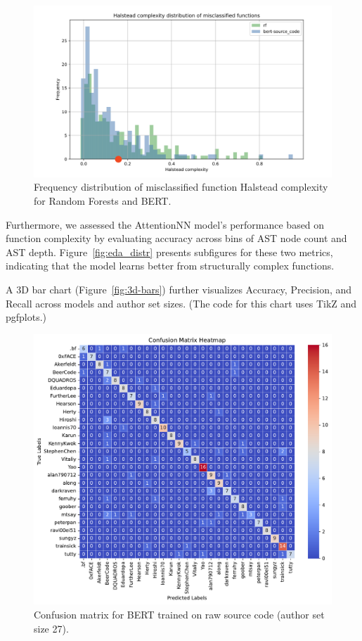 \documentclass[conference]{IEEEtran}
\begin{document}
\begin{figure}[!b]
    \centering
    \hspace*{-25pt}\includegraphics[width=1.2\columnwidth]{figures/misclass_hs.png}
    \caption{Frequency distribution of misclassified function Halstead complexity for Random Forests and BERT.}
    \label{fig:misclass_halstead}
\end{figure}

Furthermore, we assessed the AttentionNN model’s performance based on function complexity by evaluating accuracy across bins of AST node count and AST depth. Figure~\ref{fig:eda_distr} presents subfigures for these two metrics, indicating that the model learns better from structurally complex functions.

A 3D bar chart (Figure~\ref{fig:3d-bars}) further visualizes Accuracy, Precision, and Recall across models and author set sizes. (The code for this chart uses TikZ and pgfplots.)

\begin{figure}[!t]
    \centering
    \includegraphics[width=\columnwidth]{figures/conf_matrix_sourcode_bert_ts27.pdf}
    \caption{Confusion matrix for BERT trained on raw source code (author set size 27).}
    \label{fig:conf_matrix_bert}
\end{figure}
\end{document}
